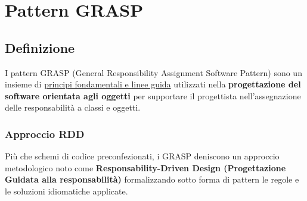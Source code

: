 \chapter{Pattern GRASP}
\section{Definizione}
I pattern GRASP (General Responsibility Assignment Software Pattern) sono un insieme di \uline{principi fondamentali e linee guida} utilizzati nella \textbf{progettazione del software orientata agli oggetti} per supportare il progettista nell'assegnazione delle responsabilità a classi e oggetti.

\subsection{Approccio RDD}
Più che schemi di codice preconfezionati, i GRASP deniscono un approccio metodologico noto come \textbf{Responsability-Driven Design (Progettazione Guidata alla responsabilità)} formalizzando sotto forma di pattern le regole e le soluzioni idiomatiche applicate.


